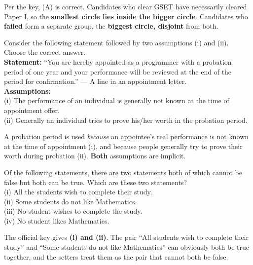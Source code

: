 
Per the key, (A) is correct. Candidates who clear GSET have necessarily cleared Paper I, so the \textbf{smallest circle lies inside the bigger circle}. Candidates who \textbf{failed} form a separate group, the \textbf{biggest circle, disjoint} from both.

Consider the following statement followed by two assumptions (i) and (ii). Choose the correct answer.\\
\textbf{Statement:} ``You are hereby appointed as a programmer with a probation period of one year and your performance will be reviewed at the end of the period for confirmation.'' --- A line in an appointment letter.\\
\textbf{Assumptions:}\\
(i) The performance of an individual is generally not known at the time of appointment offer.\\
(ii) Generally an individual tries to prove his/her worth in the probation period.

A probation period is used \emph{because} an appointee's real performance is not known at the time of appointment (i), and because people generally try to prove their worth during probation (ii). \textbf{Both} assumptions are implicit.

Of the following statements, there are two statements both of which cannot be false but both can be true. Which are these two statements?\\
(i) All the students wish to complete their study.\\
(ii) Some students do not like Mathematics.\\
(iii) No student wishes to complete the study.\\
(iv) No student likes Mathematics.

The official key gives \textbf{(i) and (ii)}. The pair ``All students wish to complete their study'' and ``Some students do not like Mathematics'' can obviously both be true together, and the setters treat them as the pair that cannot both be false.

